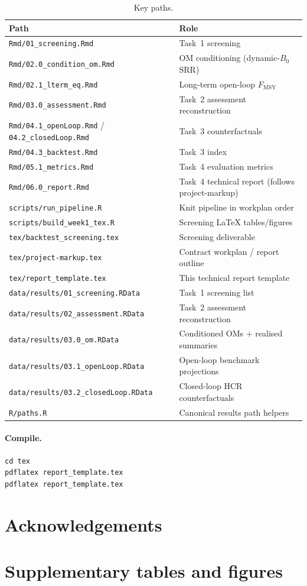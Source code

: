 \documentclass[11pt,a4paper]{extarticle}
\begin{document}
\begin{table}[H]
\centering
\caption{Key paths.}
\label{tab:paths}
\begin{tabular}{@{}ll@{}}
\toprule
Path & Role \\
\midrule
\texttt{Rmd/01\_screening.Rmd} & Task~1 screening \\
\texttt{Rmd/02.0\_condition\_om.Rmd} & OM conditioning (dynamic-\(B_0\) SRR) \\
\texttt{Rmd/02.1\_lterm\_eq.Rmd} & Long-term open-loop \(F_{\mathrm{MSY}}\) \\
\texttt{Rmd/03.0\_assessment.Rmd} & Task~2 assessment reconstruction \\
\texttt{Rmd/04.1\_openLoop.Rmd} / \texttt{04.2\_closedLoop.Rmd} & Task~3 counterfactuals \\
\texttt{Rmd/04.3\_backtest.Rmd} & Task~3 index \\
\texttt{Rmd/05.1\_metrics.Rmd} & Task~4 evaluation metrics \\
\texttt{Rmd/06.0\_report.Rmd} & Task~4 technical report (follows project-markup) \\
\texttt{scripts/run\_pipeline.R} & Knit pipeline in workplan order \\
\texttt{scripts/build\_week1\_tex.R} & Screening LaTeX tables/figures \\
\texttt{tex/backtest\_screening.tex} & Screening deliverable \\
\texttt{tex/project-markup.tex} & Contract workplan / report outline \\
\texttt{tex/report\_template.tex} & This technical report template \\
\texttt{data/results/01\_screening.RData} & Task~1 screening list \\
\texttt{data/results/02\_assessment.RData} & Task~2 assessment reconstruction \\
\texttt{data/results/03.0\_om.RData} & Conditioned OMs + realised summaries \\
\texttt{data/results/03.1\_openLoop.RData} & Open-loop benchmark projections \\
\texttt{data/results/03.2\_closedLoop.RData} & Closed-loop HCR counterfactuals \\
\texttt{R/paths.R} & Canonical results path helpers \\
\bottomrule
\end{tabular}
\end{table}

\paragraph{Compile.}
\begin{verbatim}
cd tex
pdflatex report_template.tex
pdflatex report_template.tex
\end{verbatim}

\section*{Acknowledgements}

\appendix
\section{Supplementary tables and figures}
\label{sec:appendix}
\end{document}
